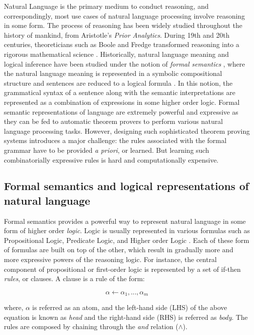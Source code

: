 \documentclass[letterpaper, 12pt]{report}
\begin{document}
Natural Language is the primary medium to conduct reasoning, and correspondingly, most use cases of natural language processing involve reasoning in some form. The process of reasoning has been widely studied throughout the history of mankind, from Aristotle's \textit{Prior Analytics}. During 19th and 20th centuries, theoreticians such as Boole and Fredge transformed reasoning into a rigorous mathematical science \cite{van2008brief}. Historically, natural language meaning and logical inference have been studied under the notion of \textit{formal semantics} \cite{van1995language}, where the natural language meaning is represented in a symbolic compositional structure and sentences are reduced to a logical formula \cite{MacCartney2009-sz}. In this notion, the grammatical syntax of a sentence along with the semantic interpretations are represented as a combination of expressions in some higher order logic. Formal semantic representations of language are extremely powerful and expressive as they can be fed to automatic theorem provers to perform various natural language processing tasks. However, designing such sophisticated theorem proving systems introduces a major challenge: the rules associated with the formal grammar have to be provided \textit{a priori}, or learned. But learning such combinatorially expressive rules is hard and computationally expensive.

\subsection{Formal semantics and logical representations of natural language}
\label{sec:bg_formal_semantics}

Formal semantics provides a powerful way to represent natural language in some form of higher order \textit{logic}. Logic is usually represented in various formulas such as Propositional Logic, Predicate Logic, and Higher order Logic \cite{kowalski1979logic}. Each of these form of formulas are built on top of the other, which result in gradually more and more expressive powers of the reasoning logic.
For instance, the central component of propositional or first-order logic is represented by a set of if-then \textit{rules}, or clauses. A clause is a rule of the form:

\begin{equation}
    \alpha \leftarrow \alpha_1, ... , \alpha_m
\end{equation}

\noindent where, $\alpha$ is referred as an atom, and the left-hand side (LHS) of the above equation is known as \textit{head} and the right-hand side (RHS) is referred as \textit{body}. The rules are composed by chaining through the \textit{and} relation ($\land$).
\end{document}
